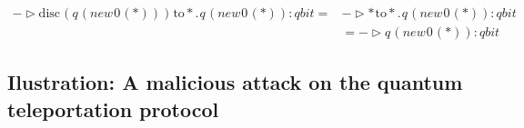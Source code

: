 \begin{equation}
  \begin{split}
  - \triangleright \text{disc} \hspace{1pt} (q \hspace{1pt} (\textit{new}\hspace{1pt}0 \hspace{1pt}(*))) \hspace{1pt} \text{to} *. \hspace{1pt} q \hspace{1pt} (\textit{new}\hspace{1pt}0 \hspace{1pt}(*)): \textit{qbit} =& - \triangleright * \hspace{1pt} \text{to} *. \hspace{1pt} q \hspace{1pt} (\textit{new}\hspace{1pt}0 \hspace{1pt}(*)): \textit{qbit}\\
  & = - \triangleright q \hspace{1pt} (\textit{new}\hspace{1pt}0 \hspace{1pt}(*)): \textit{qbit} 
\end{split}
\end{equation}

\subsection{Ilustration: A malicious attack on the quantum teleportation protocol}





